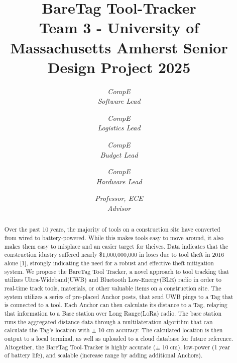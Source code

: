 \documentclass[conference]{IEEEtran}
\begin{document}
\title{BareTag Tool-Tracker\\
{\footnotesize {Team 3 - University of Massachusetts Amherst Senior Design Project 2025 }}
}

\author{
\textit{CompE}\\
\textit{Software Lead}

\and
{}
\textit{CompE}\\
\textit{Logistics Lead}

\and
{}
\textit{CompE}\\
\textit{Budget Lead}

\and
{}
\textit{CompE}\\
\textit{Hardware Lead}

\and 
{}
\textit{Professor, ECE}\\
\textit{Advisor}

}

\maketitle

\begin{abstract}
    Over the past 10 years, the majority of tools on a construction 
    site have converted from wired to battery-powered. While this 
    makes tools easy to move around, it also makes them easy to misplace
    and an easier target for theives. Data indicates that the construction
    idustry suffered nearly \$1,000,000,000 in loses due to tool theft in
    2016 alone [1], strongly indicating the need for a robust and effective 
    theft mitigation system. We propose the BareTag Tool Tracker, a novel
    approach to tool tracking that utilizes Ultra-Wideband(UWB) and Bluetooth 
    Low-Energy(BLE) radio in order to real-time track tools, materials, or other 
    valuable items on a construction site. The system utilizes a series
    of pre-placed Anchor posts, that send UWB pings to a Tag that is connected
    to a tool. Each Anchor can then calculate its distance to a Tag, relaying
    that information to a Base station over Long Range(LoRa) radio. The 
    base station runs the aggregated distance data through a multilateration
    algorithm that can calculate the Tag's location with $\pm$ 10 cm accuracy.
    The calculated location is then output to a local terminal, as well as 
    uploaded to a cloud database for future reference. Altogether, the BareTag Tool-Tracker
    is highly accurate ($\pm$ 10 cm), low-power (1 year of battery life), and
    scalable (increase range by adding additional Anchors).
\end{abstract}
\end{document}
